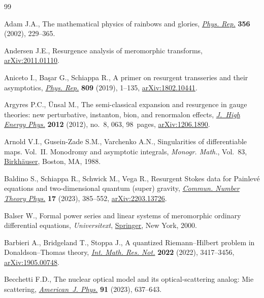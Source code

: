 \begin{thebibliography}{99}
\footnotesize\itemsep=0pt

Adam J.A., The mathematical physics of rainbows and glories,
 \href{https://doi.org/10.1016/S0370-1573(01)00076-X}{\textit{Phys. Rep.}}
 \textbf{356} (2002), 229--365.

Andersen J.E., Resurgence analysis of meromorphic transforms,
 \href{http://arxiv.org/abs/2011.01110}{arXiv:2011.01110}.

Aniceto I., Ba\c{s}ar G., Schiappa R., A primer on resurgent transseries and
 their asymptotics,
 \href{https://doi.org/10.1016/j.physrep.2019.02.003}{\textit{Phys. Rep.}}
 \textbf{809} (2019), 1--135,
 \href{http://arxiv.org/abs/1802.10441}{arXiv:1802.10441}.

Argyres P.C., \"Unsal M., The semi-classical expansion and resurgence in gauge
 theories: new perturbative, instanton, bion, and renormalon effects,
 \href{https://doi.org/10.1007/JHEP08(2012)063}{\textit{J.~High Energy Phys.}}
 \textbf{2012} (2012), no.~8, 063, 98~pages,
 \href{http://arxiv.org/abs/1206.1890}{arXiv:1206.1890}.

Arnold V.I., Gusein-Zade S.M., Varchenko A.N., Singularities of differentiable
 maps. {V}ol.~{II}. {M}onodromy and asymptotic integrals, \textit{Monogr.
 Math.}, Vol.~83,
 \href{https://doi.org/10.1007/978-1-4612-3940-6}{Birkh\"auser}, Boston, MA,
 1988.

Baldino S., Schiappa R., Schwick M., Vega R., Resurgent {S}tokes data for
 {P}ainlev\'e equations and two-dimensional quantum (super) gravity,
 \href{https://doi.org/10.4310/cntp.2023.v17.n2.a5}{\textit{Commun. Number
 Theory Phys.}} \textbf{17} (2023), 385--552,
 \href{http://arxiv.org/abs/2203.13726}{arXiv:2203.13726}.

Balser W., Formal power series and linear systems of meromorphic ordinary
 differential equations, \textit{Universitext},
 \href{https://doi.org/10.1007/b97608}{Springer}, New York, 2000.

Barbieri A., Bridgeland T., Stoppa J., A quantized {R}iemann--{H}ilbert problem
 in {D}onaldson--{T}homas theory,
 \href{https://doi.org/10.1093/imrn/rnaa294}{\textit{Int. Math. Res. Not.}}
 \textbf{2022} (2022), 3417--3456,
 \href{http://arxiv.org/abs/1905.00748}{arXiv:1905.00748}.

Becchetti F.D., The nuclear optical model and its optical-scattering analog:
 {M}ie scattering,
 \href{https://doi.org/10.1119/5.0152813}{\textit{American~J. Phys.}}
 \textbf{91} (2023), 637--643.


\end{thebibliography}
